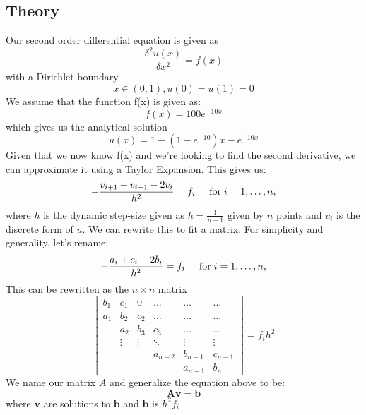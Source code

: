 \documentclass{article}
\begin{document}
\subsection{Theory}
Our second order differential equation is given as
\begin{equation}
    \frac{\delta^2 u(x)}{\delta x^2} = f(x)
\end{equation}
with a Dirichlet boundary $$x \in (0,1), u(0)=u(1)=0$$
We assume that the function f(x) is given as:
\begin{equation}
    f(x) = 100e^{-10x}
\end{equation}
which gives us the analytical solution
\begin{equation}
    u(x) = 1-(1-e^{-10})x-e^{-10x}
\end{equation}
Given that we now know f(x) and we're looking to find the second derivative, we can approximate it using a Taylor Expansion. This gives us:
\begin{equation}
   -\frac{v_{i+1}+v_{i-1}-2v_i}{h^2} = f_i  \hspace{0.5cm} \mathrm{for} \hspace{0.1cm} i=1,\dots, n,
\end{equation}
where $h$ is the dynamic step-size given as $h = \frac{1}{n-1}$ given by $n$ points and $v_{i}$ is the discrete form of $u$.
We can rewrite this to fit a matrix. For simplicity and generality, let's rename:
\begin{equation}
   -\frac{a_{i}+c_{i}-2b_{i}}{h^2} = f_i  \hspace{0.5cm} \mathrm{for} \hspace{0.1cm} i=1,\dots, n,
\end{equation}
This can be rewritten as the $n\times n$ matrix
\[
\begin{bmatrix}
                           b_1& c_1 & 0 &\dots   & \dots &\dots \\
                           a_1 & b_2 & c_2 &\dots &\dots &\dots \\
                           & a_2 & b_3 & c_3 & \dots & \dots \\
                           & \vdots   & \vdots &\ddots   &\vdots & \vdots \\
                           &   &  &a_{n-2}  &b_{n-1}& c_{n-1} \\
                           &    &  &   &a_{n-1} & b_n 
            \end{bmatrix} = f_i h^2
\]
We name our matrix $A$ and generalize the equation above to be:
\begin{equation} \label{4}
    \mathbf{A}\mathbf{v}=\mathbf{b}
\end{equation}
where $\mathbf{v}$ are solutions to $\mathbf{b}$ and $\mathbf{b}$ is $h^2f_i$
\end{document}

